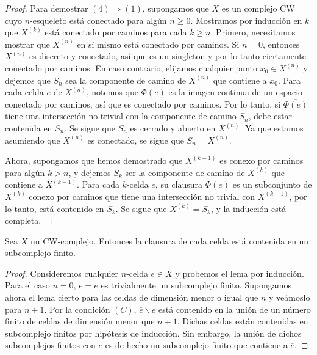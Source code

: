 \begin{proof}
	Para demostrar \((4) \Rightarrow (1)\), supongamos que \(X\) es un complejo CW cuyo \(n\)-esqueleto está conectado para algún \(n \geq 0\). Mostramos por inducción en \(k\) que \(X^{(k)}\) está conectado por caminos para cada \(k \geq n\). Primero, necesitamos mostrar que \(X^{(n)}\) en sí mismo está conectado por caminos. Si \(n = 0\), entonces \(X^{(n)}\) es discreto y conectado, así que es un singleton y por lo tanto ciertamente conectado por caminos. En caso contrario, elijamos cualquier punto \(x_0 \in X^{(n)}\) y dejemos que \(S_n\) sea la componente de camino de \(X^{(n)}\) que contiene a \(x_0\). Para cada celda \(e\) de \(X^{(n)}\), notemos que \(\overline{\Phi(e)}\) es la imagen continua de un espacio conectado por caminos, así que es conectado por caminos. Por lo tanto, si \(\overline{\Phi(e)}\) tiene una intersección no trivial con la componente de camino \(S_n\), debe estar contenida en \(S_n\). Se sigue que \(S_n\) es cerrado y abierto en \(X^{(n)}\). Ya que estamos asumiendo que \(X^{(n)}\) es conectado, se sigue que \(S_n = X^{(n)}\).
	
	Ahora, supongamos que hemos demostrado que \(X^{(k-1)}\) es conexo por caminos para algún \(k > n\), y dejemos \(S_k\) ser la componente de camino de \(X^{(k)}\) que contiene a \(X^{(k-1)}\). Para cada \(k\)-celda \(e\), su clausura \(\overline{\Phi(e)}\) es un subconjunto de \(X^{(k)}\) conexo por caminos que tiene una intersección no trivial con \(X^{(k-1)}\), por lo tanto, está contenido en \(S_k\). Se sigue que \(X^{(k)} = S_k\), y la inducción está completa.
\end{proof}

\begin{lema}
	\label{lem:cw-cl-finite-subcomplex}
	Sea \(X\) un CW-complejo. Entonces la clausura de cada celda está contenida en un subcomplejo finito.
\end{lema}
\begin{proof}
	Consideremos cualquier \(n\)-celda \(e \in X\) y probemos el lema por inducción. Para el caso \(n=0\), 
	\(\overline{e} = e\) es trivialmente un subcomplejo finito. Supongamos ahora el lema cierto para 
	las celdas de dimensión menor o igual que \(n\) 	y veámoslo para \(n+1\). Por la condición \((C)\), 
	\(\overline{e} \backslash e\) está contenido en la unión de un número finito de celdas de dimensión menor 
	que \(n+1\). Dichas celdas están contenidas en subcomplejo finitos por hipótesis de inducción. 
	Sin embargo, la unión de dichos subcomplejos finitos con \(e\) es de hecho un subcomplejo finito 
	que contiene a \(\overline{e}\).
\end{proof}

